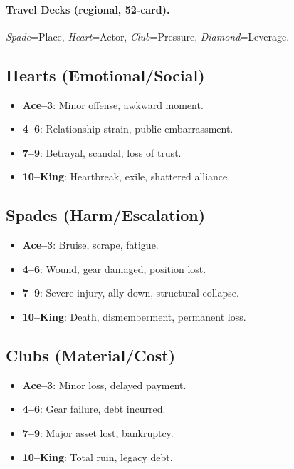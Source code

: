\paragraph{Travel Decks (regional, 52-card).}
\emph{Spade}=Place, \emph{Heart}=Actor, \emph{Club}=Pressure, \emph{Diamond}=Leverage.

\subsection*{Hearts (Emotional/Social)}

\begin{itemize}
    \item \textbf{Ace--3}: Minor offense, awkward moment.
    \item \textbf{4--6}: Relationship strain, public embarrassment.
    \item \textbf{7--9}: Betrayal, scandal, loss of trust.
    \item \textbf{10--King}: Heartbreak, exile, shattered alliance.
\end{itemize}

\subsection*{Spades (Harm/Escalation)}

\begin{itemize}
    \item \textbf{Ace--3}: Bruise, scrape, fatigue.
    \item \textbf{4--6}: Wound, gear damaged, position lost.
    \item \textbf{7--9}: Severe injury, ally down, structural collapse.
    \item \textbf{10--King}: Death, dismemberment, permanent loss.
\end{itemize}

\subsection*{Clubs (Material/Cost)}

\begin{itemize}
    \item \textbf{Ace--3}: Minor loss, delayed payment.
    \item \textbf{4--6}: Gear failure, debt incurred.
    \item \textbf{7--9}: Major asset lost, bankruptcy.
    \item \textbf{10--King}: Total ruin, legacy debt.
\end{itemize}


